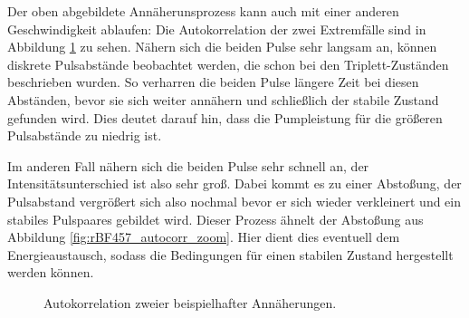 \documentclass[bachelor,       %
               twoside,        %
               BCOR10mm,       %
               liststotoc,nomtotoc,bibtotoc, %
               english,ngerman, %
               final,          %
               ]{GAUBM}
\begin{document}
Der oben abgebildete Annäherunsprozess kann auch mit einer anderen Geschwindigkeit ablaufen:
Die Autokorrelation der zwei Extremfälle sind in Abbildung \ref{fig:StartAnnaehrung2} zu sehen.
Nähern sich die beiden Pulse sehr langsam an, können diskrete Pulsabstände beobachtet werden, die schon bei den Triplett-Zuständen beschrieben wurden.
So verharren die beiden Pulse längere Zeit bei diesen Abständen, bevor sie sich weiter annähern und schließlich der stabile Zustand gefunden wird.
Dies deutet darauf hin, dass die Pumpleistung für die größeren Pulsabstände zu niedrig ist.

Im anderen Fall nähern sich die beiden Pulse sehr schnell an, der Intensitätsunterschied ist also sehr groß.
Dabei kommt es zu einer Abstoßung, der Pulsabstand vergrößert sich also nochmal bevor er sich wieder verkleinert und ein stabiles Pulspaares gebildet wird.
Dieser Prozess ähnelt der Abstoßung aus Abbildung \ref{fig:rBF457_autocorr_zoom}.
Hier dient dies eventuell dem Energieaustausch, sodass die Bedingungen für einen stabilen Zustand hergestellt werden können.
\begin{figure}[!htb]
   \centering
   \hfill
   \caption{Autokorrelation zweier beispielhafter Annäherungen.}
   \label{fig:StartAnnaehrung2}
\end{figure}
\end{document}
